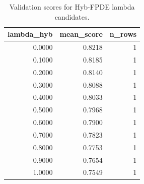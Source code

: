 \begin{table}[t]
\caption{Validation scores for Hyb-FPDE lambda candidates.}
\label{tab:lambda_distribution_computed}
\centering
\begin{tabular}{rrr}
\toprule
lambda\_hyb & mean\_score & n\_rows \\
\midrule
0.0000 & 0.8218 & 1 \\
0.1000 & 0.8185 & 1 \\
0.2000 & 0.8140 & 1 \\
0.3000 & 0.8088 & 1 \\
0.4000 & 0.8033 & 1 \\
0.5000 & 0.7968 & 1 \\
0.6000 & 0.7900 & 1 \\
0.7000 & 0.7823 & 1 \\
0.8000 & 0.7753 & 1 \\
0.9000 & 0.7654 & 1 \\
1.0000 & 0.7549 & 1 \\
\bottomrule
\end{tabular}

\end{table}
